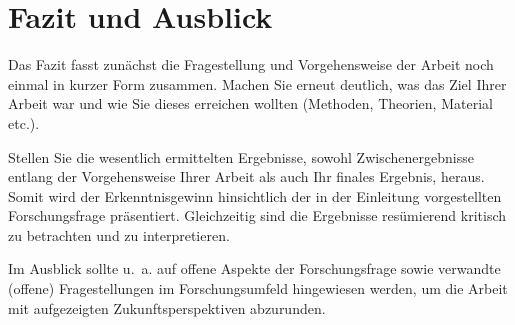 \section{Fazit und Ausblick}\label{sec:fazit}

Das Fazit fasst zunächst die Fragestellung und Vorgehensweise der Arbeit noch einmal in kurzer Form zusammen. Machen Sie erneut deutlich, was das Ziel Ihrer Arbeit war und wie Sie dieses erreichen wollten (Methoden, Theorien, Material etc.). 

Stellen Sie die wesentlich ermittelten Ergebnisse, sowohl Zwischenergebnisse entlang der Vorgehensweise Ihrer Arbeit als auch Ihr finales Ergebnis, heraus. Somit wird der Erkenntnisgewinn hinsichtlich der in der Einleitung vorgestellten Forschungsfrage präsentiert. Gleichzeitig sind die Ergebnisse resümierend kritisch zu betrachten und zu interpretieren.

Im Ausblick sollte u.~a. auf offene Aspekte der Forschungsfrage sowie verwandte (offene) Fragestellungen im Forschungsumfeld hingewiesen werden, um die Arbeit mit aufgezeigten Zukunftsperspektiven abzurunden. 
